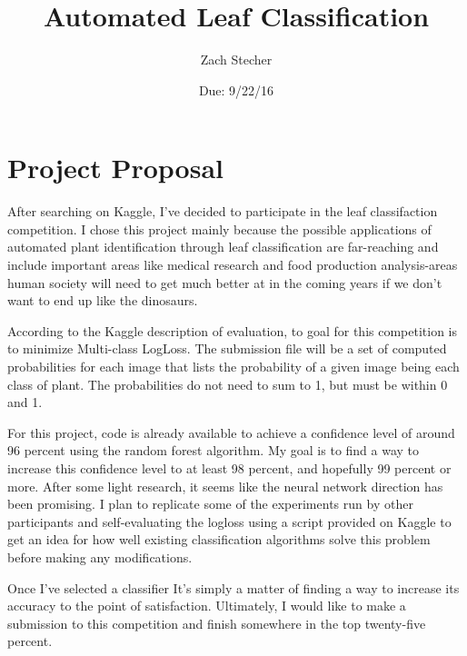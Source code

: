 \documentclass[11pt]{article}
\title{Automated Leaf Classification}
\author{Zach Stecher}
\date{Due: 9/22/16}
\begin{document}
\maketitle

\section*{Project Proposal}
After searching on Kaggle, I've decided to participate in the leaf classifaction competition. I chose this project mainly because the possible applications of automated plant identification through leaf classification are far-reaching and include important areas like medical research and food production analysis-areas human society will need to get much better at in the coming years if we don't want to end up like the dinosaurs.

According to the Kaggle description of evaluation, to goal for this competition is to minimize Multi-class LogLoss. The submission file will be a set of computed probabilities for each image that lists the probability of a given image being each class of plant. The probabilities do not need to sum to 1, but must be within 0 and 1.

For this project, code is already available to achieve a confidence level of around 96 percent using the random forest algorithm. My goal is to find a way to increase this confidence level to at least 98 percent, and hopefully 99 percent or more. After some light research, it seems like the neural network direction has been promising. I plan to replicate some of the experiments run by other participants and self-evaluating the logloss using a script provided on Kaggle to get an idea for how well existing classification algorithms solve this problem before making any modifications.

Once I've selected a classifier It's simply a matter of finding a way to increase its accuracy to the point of satisfaction. Ultimately, I would like to make a submission to this competition and finish somewhere in the top twenty-five percent.
\end{document}
